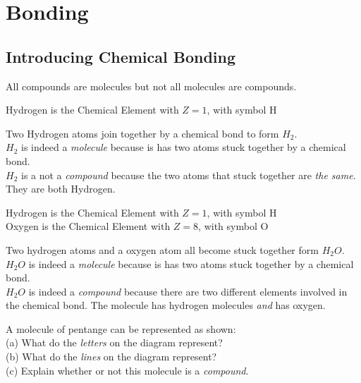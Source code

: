 
\chapter{Bonding}




\section{Introducing Chemical Bonding}




All compounds are molecules but not all molecules are compounds.

\frmrule

\begin{example}
Hydrogen is the Chemical Element with $Z = 1$, with symbol H

Two Hydrogen atoms join together by a chemical bond to form $H_2$. \\
$H_2$ is indeed a \textit{molecule} because is has two atoms stuck together by a chemical bond. \\
$H_2$ is a not a \textit{compound} because the two atoms that stuck together are \textit{the same}. 
They are both Hydrogen.
\end{example}

\frmrule

\begin{example}
Hydrogen is the Chemical Element with $Z = 1$, with symbol H\\
Oxygen is the Chemical Element with $Z = 8$, with symbol O

Two hydrogen atoms and a oxygen atom all become stuck together form $H_2O$. \\
$H_2O$ is indeed a \textit{molecule} because is has two atoms stuck together by a chemical bond. \\
$H_2O$ is indeed a \textit{compound} because there are two different elements involved in the chemical bond. 
The molecule has hydrogen molecules \textit{and} has oxygen. 
\end{example}

\frmrule

\begin{example}
A molecule of pentange can be represented as shown: \\
(a) What do the \textit{letters} on the diagram represent? \\
(b) What do the \textit{lines} on the diagram represent? \\
(c) Explain whether or not this molecule is a \textit{compound}.
\end{example}

